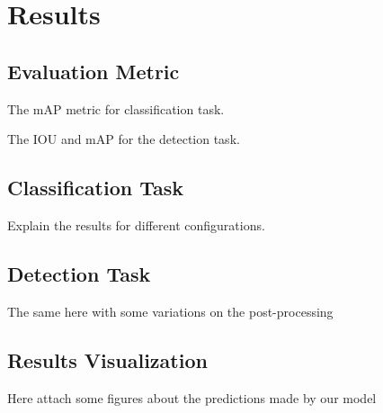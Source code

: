 \chapter{Results}

\section{Evaluation Metric}

The mAP metric for classification task.

The IOU and mAP for the detection task.

\section{Classification Task}

Explain the results for different configurations.

\section{Detection Task}

The same here with some variations on the post-processing

\section{Results Visualization}

Here attach some figures about the predictions made by our model
